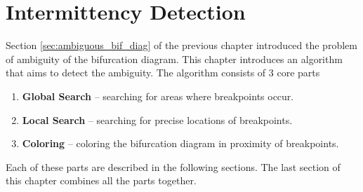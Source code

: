 \chapter{Intermittency Detection}
Section \ref{sec:ambiguous_bif_diag} of the previous chapter introduced the problem of ambiguity of the bifurcation diagram.
This chapter introduces an algorithm that aims to detect the ambiguity.
The algorithm consists of 3 core parts


\begin{enumerate}
	\item \textbf{Global Search} -- searching for areas where breakpoints occur.
	\item \textbf{Local Search} -- searching for precise locations of breakpoints.
	\item \textbf{Coloring} -- coloring the bifurcation diagram in proximity of breakpoints.
\end{enumerate}

Each of these parts are described in the following sections.
The last section of this chapter combines all the parts together.

